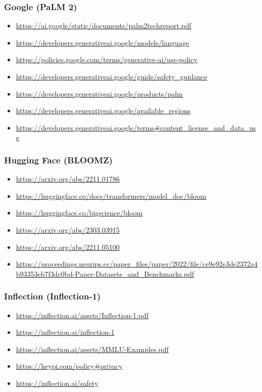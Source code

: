 \subsubsection{Google (PaLM 2)}
\begin{itemize}
    \item \url{https://ai.google/static/documents/palm2techreport.pdf}
    \item \url{https://developers.generativeai.google/models/language}
    \item \url{https://policies.google.com/terms/generative-ai/use-policy}
    \item \url{https://developers.generativeai.google/guide/safety_guidance}
    \item \url{https://developers.generativeai.google/products/palm}
    \item \url{https://developers.generativeai.google/available_regions}
    \item \url{https://developers.generativeai.google/terms#content_license_and_data_use}
\end{itemize}

\subsubsection{Hugging Face (BLOOMZ)}
\begin{itemize}
    \item \url{https://arxiv.org/abs/2211.01786}
    \item \url{https://huggingface.co/docs/transformers/model_doc/bloom}
    \item \url{https://huggingface.co/bigscience/bloom}
    \item \url{https://arxiv.org/abs/2303.03915}
    \item \url{https://arxiv.org/abs/2211.05100}
    \item \url{https://proceedings.neurips.cc/paper_files/paper/2022/file/ce9e92e3de2372a4b93353eb7f3dc0bd-Paper-Datasets_and_Benchmarks.pdf}
\end{itemize}

\subsubsection{Inflection (Inflection-1)}
\begin{itemize}
    \item \url{https://inflection.ai/assets/Inflection-1.pdf}
    \item \url{https://inflection.ai/inflection-1}
    \item \url{https://inflection.ai/assets/MMLU-Examples.pdf}
    \item \url{https://heypi.com/policy#privacy}
    \item \url{https://inflection.ai/safety}
\end{itemize}

